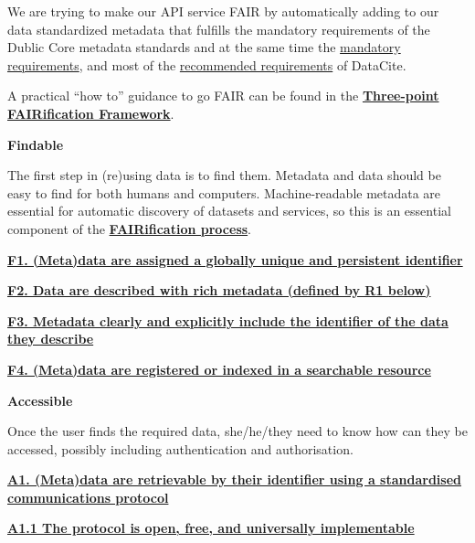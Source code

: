 \documentclass[
  a4paper,
  openany, a4paper, oneside]{book}
\begin{document}
We are trying to make our API service FAIR by automatically adding to our data standardized metadata that fulfills the mandatory requirements of the Dublic Core metadata standards and at the same time the \href{https://support.datacite.org/docs/datacite-metadata-schema-v44-mandatory-properties}{mandatory requirements}, and most of the \href{https://support.datacite.org/docs/datacite-metadata-schema-v44-recommended-and-optional-properties}{recommended requirements} of DataCite.

A practical ``how to'' guidance to go FAIR can be found in the \textbf{\href{https://www.go-fair.org/how-to-go-fair/}{Three-point FAIRification Framework}}.

\textbf{{F}indable}

The first step in (re)using data is to find them. Metadata and data should be easy to find for both humans and computers. Machine-readable metadata are essential for automatic discovery of datasets and services, so this is an essential component of the \textbf{\href{https://www.go-fair.org/fair-principles/fairification-process/}{FAIRification process}}.

\textbf{\href{https://www.go-fair.org/fair-principles/fair-data-principles-explained/f1-meta-data-assigned-globally-unique-persistent-identifiers/}{F1. (Meta)data are assigned a globally unique and persistent identifier}}

\textbf{\href{https://www.go-fair.org/fair-principles/fair-data-principles-explained/f2-data-described-rich-metadata/}{F2. Data are described with rich metadata (defined by R1 below)}}

\textbf{\href{https://www.go-fair.org/fair-principles/f3-metadata-clearly-explicitly-include-identifier-data-describe/}{F3. Metadata clearly and explicitly include the identifier of the data they describe}}

\textbf{\href{https://www.go-fair.org/fair-principles/f4-metadata-registered-indexed-searchable-resource/}{F4. (Meta)data are registered or indexed in a searchable resource}}

\textbf{{A}ccessible}

Once the user finds the required data, she/he/they need to know how can they be accessed, possibly including authentication and authorisation.

\textbf{\href{https://www.go-fair.org/fair-principles/542-2/}{A1. (Meta)data are retrievable by their identifier using a standardised communications protocol}}

\textbf{\href{https://www.go-fair.org/fair-principles/a1-1-protocol-open-free-universally-implementable/}{A1.1 The protocol is open, free, and universally implementable}}
\end{document}
